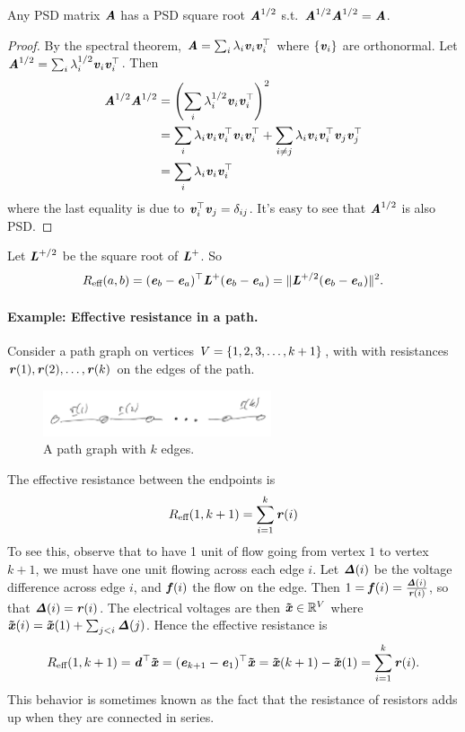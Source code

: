 \begin{claim}
	Any PSD matrix $\AA$ has a PSD square root $\AA^{1/2}$ s.t.\ $\AA^{1/2}\AA^{1/2}=\AA$.
\end{claim}
\begin{proof}
	By the spectral theorem, $\AA = \sum_i \lambda_i\vv_i\vv_i^\trp$ where $\{\vv_i\}$ are orthonormal. Let $\AA^{1/2} = \sum_i \lambda_i^{1/2}\vv_i\vv_i^\trp$. Then
	\begin{align*}
		\AA^{1/2}\AA^{1/2}
		&= \left(\sum_i \lambda_i^{1/2}\vv_i\vv_i^\trp\right)^2 \\
		&= \sum_{i}\lambda_i \vv_i\vv_i^\trp\vv_i\vv_i^\trp + \sum_{i\neq j}\lambda_i \vv_i\vv_i^\trp\vv_j\vv_j^\trp \\
		&= \sum_i \lambda_i\vv_i\vv_i^\trp \\
	\end{align*}
	where the last equality is due to $\vv_i^\trp\vv_j = \delta_{ij}$. It's easy to see that $\AA^{1/2}$ is also PSD.
\end{proof}

Let $\LL^{+/2}$ be the square root of $\LL^{+}$. So
\[ \er(a,b) = (\ee_b-\ee_a)^\trp\LL^{\pinv}(\ee_b-\ee_a) = \|\LL^{+/2}(\ee_b-\ee_a)\|^2. \]

\paragraph{Example: Effective resistance in a path.}
Consider a path graph on vertices $V = \setof{1,2,3,\ldots, k+1}$,
with with resistances $\rr(1), \rr(2), \ldots, \rr(k)$ on
the edges of the path.
\begin{figure}[H]
  \centering
  \includegraphics[width=0.6\textwidth]{fig/lecture6_seriesres.jpeg}
  \caption{A path graph with $k$ edges.}
\label{fig:seriesres}
\end{figure}
The effective resistance between the
endpoints is
\[
  \er(1,k+1) = \sum_{i = 1}^{k} \rr(i)
  \]
To see this, observe that to have 1 unit of flow going from vertex $1$ to vertex $k+1$, we must
have one unit flowing across each edge $i$.
Let $\DDelta(i)$ be the voltage difference across edge $i$, and $\ff(i)$ the
flow on the edge.
Then $1 = \ff(i) = \frac{\DDelta(i)}{\rr(i)}$, so that $\DDelta(i) =
\rr(i)$.
The electrical voltages are then $\xxtil \in \R^V$ where $\xxtil(i) =
\xxtil(1) + \sum_{j < i} \DDelta(j)$.
Hence the effective resistance is
\[\er(1,k+1) = \dd^{\trp}\xxtil=  (\ee_{k+1}-\ee_{1})^{\trp}\xxtil = \xxtil(k+1) -
  \xxtil(1) = \sum_{i = 1}^{k} \rr(i)
.
\]
This behavior is sometimes known as the fact that the resistance of
resistors adds up when they are connected in series.


